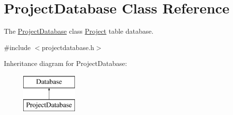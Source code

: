 \hypertarget{classProjectDatabase}{\section{Project\-Database Class Reference}
\label{classProjectDatabase}
}


The \hyperlink{classProjectDatabase}{Project\-Database} class \hyperlink{classProject}{Project} table database.  




{\ttfamily \#include $<$projectdatabase.\-h$>$}

Inheritance diagram for Project\-Database\-:\begin{figure}[H]
\begin{center}
\leavevmode
\includegraphics[height=2.000000cm]{d4/d8d/classProjectDatabase}
\end{center}
\end{figure}

